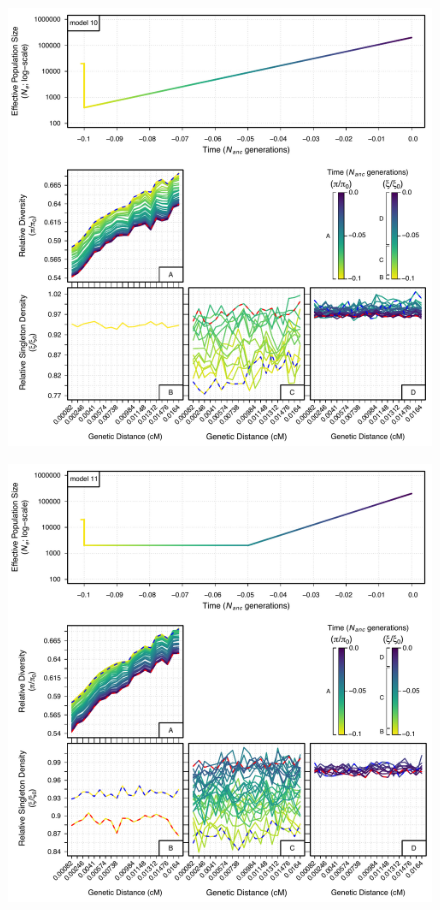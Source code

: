 \documentclass[9pt,twocolumn,twoside]{rilabRxiv}
\begin{document}
\begin{figure}[htb]\ContinuedFloat
      \centering
      \includegraphics[width=\linewidth]{figures/FigS18.pdf}
\end{figure}
\begin{figure}[htb]\ContinuedFloat
      \centering
      \includegraphics[width=\linewidth]{figures/FigS19.pdf}
\end{figure}
\end{document}
